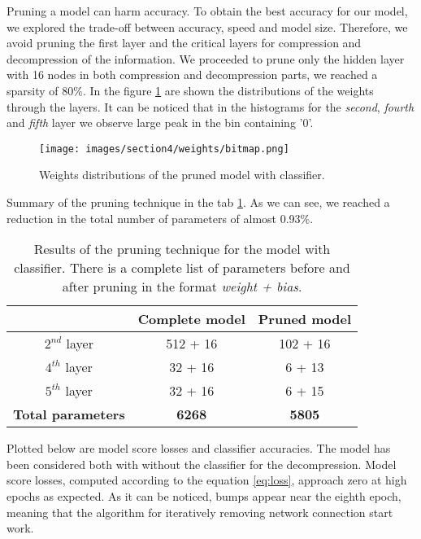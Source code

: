 \documentclass{article}
\begin{document}
\par Pruning a model can harm accuracy. 
To obtain the best accuracy for our model, we explored the trade-off between accuracy, speed and model size.
Therefore, we avoid pruning the first layer and the critical layers for compression and decompression of the information.
We proceeded to prune only the hidden layer with 16 nodes in both compression and decompression parts, we reached a sparsity of 80\%. 
In the figure \ref{fig:weights} are shown the distributions of the weights through the layers.
It can be noticed that in the histograms for the \textit{second}, \textit{fourth} and \textit{fifth} layer we observe large peak in the bin containing '$0$'.

\begin{figure}[H]
  \centering
  \texttt{[image: images/section4/weights/bitmap.png]}
  \caption{Weights distributions of the pruned model with classifier.}
  \label{fig:weights}
\end{figure}

Summary of the pruning technique in the tab \ref{tab:params}. 
As we can see, we reached a reduction in the total number of parameters of almost 0.93\%.

\begin{table} [H]
  \centering
  \begin{tabular}{| c | c | c |}
  
  \hline
  & Complete model  &   Pruned model  \\
  \hline 
  \hline
  $2^{nd}$ layer & 512 + 16 & 102 + 16 \\ %
  \hline
  $4^{th}$ layer & 32 + 16 & 6 + 13 \\ %
  \hline
  $5^{th}$ layer & 32 + 16 & 6 + 15  \\ %
  \hline
  \textbf{Total parameters} & \textbf{6268} & \textbf{5805} \\
  \hline
  \end{tabular}
  \caption{Results of the pruning technique for the model with classifier.
  There is a complete list of parameters before and after pruning in the format \textit{weight + bias}.}
  \label{tab:params}
\end{table} 

Plotted below are model score losses and classifier accuracies. 
The model has been considered both with without the classifier for the decompression.
Model score losses, computed according to the equation \ref{eq:loss}, approach zero at high epochs as expected.
As it can be noticed, bumps appear near the eighth epoch, meaning that the algorithm for iteratively removing network connection start work.
\end{document}
